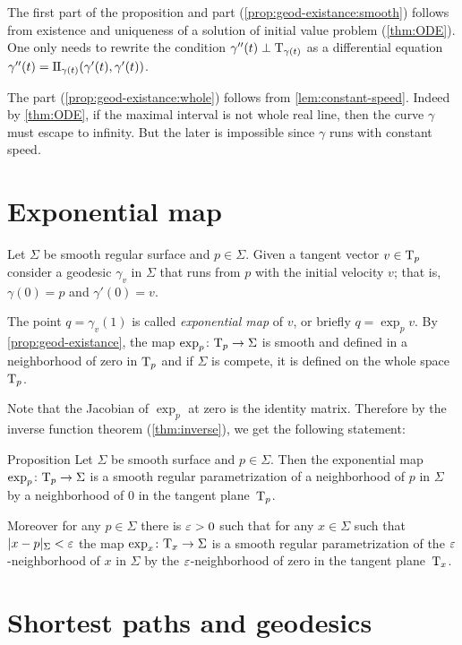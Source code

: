 The first part of the proposition and part (\ref{prop:geod-existance:smooth}) follows from existence and uniqueness of a solution of initial value problem (\ref{thm:ODE}).
One only needs to rewrite the condition $\gamma''(t)\perp\mathrm{T}_{\gamma(t)}$ as a differential equation 
$\gamma''(t)=\mathrm{I}\hskip-.02em\mathrm{I}_{\gamma(t)}(\gamma'(t),\gamma'(t))$.

The part (\ref{prop:geod-existance:whole}) follows from \ref{lem:constant-speed}.
Indeed by \ref{thm:ODE}, if the maximal interval is not whole real line, then the curve $\gamma$ must escape to infinity. %
But the later is impossible since $\gamma$ runs with constant speed.
\qeds

\section*{Exponential map}

Let $\Sigma$ be smooth regular surface and $p\in \Sigma$.
Given a tangent vector $v\in \mathrm{T}_p$ consider a geodesic $\gamma_v$ in $\Sigma$ that runs from $p$ with the initial velocity $v$;  
that is, $\gamma(0)=p$ and $\gamma'(0)=v$.

The point $q=\gamma_v(1)$ is called \emph{exponential map} of $v$, or briefly $q=\exp_pv$.
By \ref{prop:geod-existance}, the map $\exp_p\colon\mathrm{T}_p\to \Sigma$ is smooth and defined in a neighborhood of zero in $\mathrm{T}_p$ and if $\Sigma$ is compete, it is defined on the whole space $\mathrm{T}_p$.

Note that the Jacobian of $\exp_p$ at zero is the identity matrix.
Therefore by the inverse function theorem (\ref{thm:inverse}), we get the following statement:

\begin{thm}{Proposition}\label{prop:exp}
Let $\Sigma$ be smooth surface and $p\in \Sigma$.
Then the exponential map $\exp_p\colon\mathrm{T}_p\to \Sigma$ is a smooth regular parametrization of a neighborhood of $p$ in $\Sigma$ by a neighborhood of $0$ in the tangent plane~$\mathrm{T}_p$.

Moreover for any $p\in \Sigma$ there is $\varepsilon>0$ such that for any $x\in \Sigma$ such that $|x-p|_\Sigma<\varepsilon$ the map 
$\exp_x\colon\mathrm{T}_x\to \Sigma$ is a smooth regular parametrization of the $\varepsilon$-neighborhood of $x$ in $\Sigma$ by the $\varepsilon$-neighborhood of zero in the tangent plane~$\mathrm{T}_x$.
\end{thm}

\section*{Shortest paths and geodesics}


